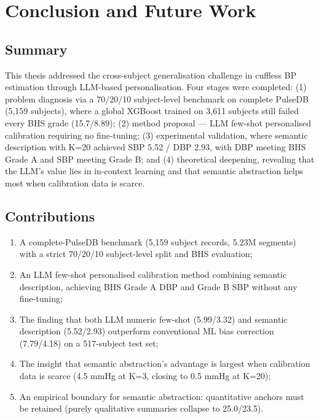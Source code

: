 \chapter{Conclusion and Future Work}
\label{ch:conclusion}

\section{Summary}

This thesis addressed the cross-subject generalisation challenge in cuffless BP estimation through LLM-based personalisation. Four stages were completed: (1) problem diagnosis via a 70/20/10 subject-level benchmark on complete PulseDB (5,159 subjects), where a global XGBoost trained on 3,611 subjects still failed every BHS grade (15.7/8.89); (2) method proposal --- LLM few-shot personalised calibration requiring no fine-tuning; (3) experimental validation, where semantic description with K=20 achieved SBP 5.52 / DBP 2.93, with DBP meeting BHS Grade A and SBP meeting Grade B; and (4) theoretical deepening, revealing that the LLM's value lies in in-context learning and that semantic abstraction helps most when calibration data is scarce.

\section{Contributions}

\begin{enumerate}
  \item A complete-PulseDB benchmark (5,159 subject records, 5.23M segments) with a strict 70/20/10 subject-level split and BHS evaluation;
  \item An LLM few-shot personalised calibration method combining semantic description, achieving BHS Grade A DBP and Grade B SBP without any fine-tuning;
  \item The finding that both LLM numeric few-shot (5.99/3.32) and semantic description (5.52/2.93) outperform conventional ML bias correction (7.79/4.18) on a 517-subject test set;
  \item The insight that semantic abstraction's advantage is largest when calibration data is scarce (4.5 mmHg at K=3, closing to 0.5 mmHg at K=20);
  \item An empirical boundary for semantic abstraction: quantitative anchors must be retained (purely qualitative summaries collapse to 25.0/23.5).
\end{enumerate}

